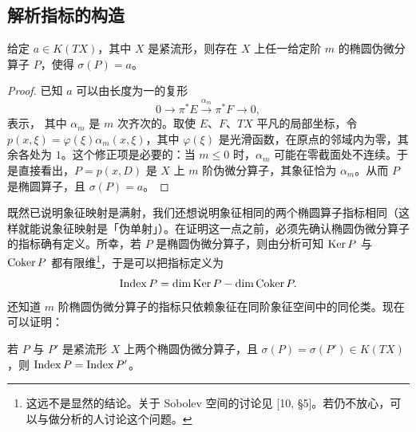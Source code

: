 
\subsection{解析指标的构造}

\begin{claim}
给定 $a\in K(TX)$，其中 $X$ 是紧流形，则存在 $X$ 上任一给定阶 $m$ 的椭圆伪微分算子 $P$，使得 $\sigma(P)=a$。
\end{claim}

\begin{proof}
已知 $a$ 可以由长度为一的复形
\[
0\to\pi^*E\xrightarrow{\alpha_m}\pi^*F\to 0,
\]
表示，
其中 $\alpha_m$ 是 $m$ 次齐次的。取使 $E$、$F$、$TX$ 平凡的局部坐标，令 $p(x,\xi)=\varphi(\xi)\alpha_m(x,\xi)$，其中 $\varphi(\xi)$ 是光滑函数，在原点的邻域内为零，其余各处为 $1$。这个修正项是必要的：当 $m\le 0$ 时，$\alpha_m$ 可能在零截面处不连续。于是直接看出，$P=p(x,D)$ 是 $X$ 上 $m$ 阶伪微分算子，其象征恰为 $\alpha_m$。从而 $P$ 是椭圆算子，且 $\sigma(P)=a$。
\end{proof}

既然已说明象征映射是满射，我们还想说明象征相同的两个椭圆算子指标相同（这样就能说象征映射是「伪单射」）。在证明这一点之前，必须先确认椭圆伪微分算子的指标确有定义。所幸，若 $P$ 是椭圆伪微分算子，则由分析可知 $\operatorname{Ker} P$ 与 $\operatorname{Coker} P$ 都有限维\footnote{这远不是显然的结论。关于 Sobolev 空间的讨论见 [10, \S5]。若仍不放心，可以与做分析的人讨论这个问题。}，于是可以把指标定义为
\[
\operatorname{Index} P=\dim\operatorname{Ker} P-\dim\operatorname{Coker} P.
\]
还知道 $m$ 阶椭圆伪微分算子的指标只依赖象征在同阶象征空间中的同伦类。现在可以证明：

\begin{claim}
若 $P$ 与 $P'$ 是紧流形 $X$ 上两个椭圆伪微分算子，且 $\sigma(P)=\sigma(P')\in K(TX)$，则 $\operatorname{Index} P=\operatorname{Index} P'$。
\end{claim}

